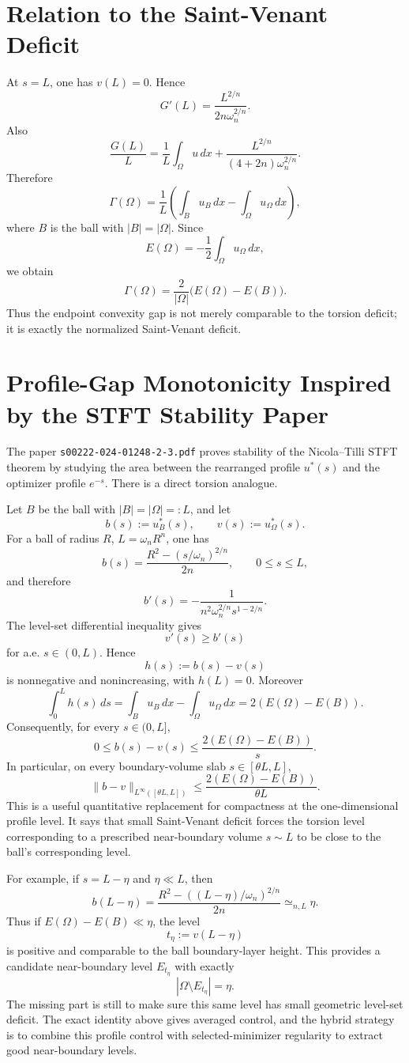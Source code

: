 \documentclass[11pt]{article}
\begin{document}
\section{Relation to the Saint-Venant Deficit}

At \(s=L\), one has \(v(L)=0\). Hence
\[
G'(L)=\frac{L^{2/n}}{2n\omega_n^{2/n}}.
\]
Also
\[
\frac{G(L)}{L}
=
\frac1L\int_\Omega u\,dx
+
\frac{L^{2/n}}{(4+2n)\omega_n^{2/n}}.
\]
Therefore
\[
\Gamma(\Omega)
=
\frac1L\left(\int_B u_B\,dx-\int_\Omega u_\Omega\,dx\right),
\]
where \(B\) is the ball with \(|B|=|\Omega|\). Since
\[
E(\Omega)=-\frac12\int_\Omega u_\Omega\,dx,
\]
we obtain
\[
\boxed{
\Gamma(\Omega)
=
\frac{2}{|\Omega|}
\big(E(\Omega)-E(B)\big).
}
\]
Thus the endpoint convexity gap is not merely comparable to the torsion
deficit; it is exactly the normalized Saint-Venant deficit.

\section{Profile-Gap Monotonicity Inspired by the STFT Stability Paper}

The paper \texttt{s00222-024-01248-2-3.pdf} proves stability of the
Nicola--Tilli STFT theorem by studying the area between the rearranged profile
\(u^*(s)\) and the optimizer profile \(e^{-s}\). There is a direct torsion
analogue.

Let \(B\) be the ball with \(|B|=|\Omega|=:L\), and let
\[
b(s):=u_B^*(s),\qquad v(s):=u_\Omega^*(s).
\]
For a ball of radius \(R\), \(L=\omega_n R^n\), one has
\[
b(s)=\frac{R^2-(s/\omega_n)^{2/n}}{2n},
\qquad 0\le s\le L,
\]
and therefore
\[
b'(s)=-\frac{1}{n^2\omega_n^{2/n}s^{1-2/n}}.
\]
The level-set differential inequality gives
\[
v'(s)\ge b'(s)
\]
for a.e. \(s\in(0,L)\). Hence
\[
h(s):=b(s)-v(s)
\]
is nonnegative and nonincreasing, with \(h(L)=0\). Moreover
\[
\int_0^L h(s)\,ds
=
\int_B u_B\,dx-\int_\Omega u_\Omega\,dx
=
2(E(\Omega)-E(B)).
\]
Consequently, for every \(s\in(0,L]\),
\[
0\le b(s)-v(s)
\le
\frac{2(E(\Omega)-E(B))}{s}.
\]
In particular, on every boundary-volume slab \(s\in[\theta L,L]\),
\[
\|b-v\|_{L^\infty([\theta L,L])}
\le
\frac{2(E(\Omega)-E(B))}{\theta L}.
\]
This is a useful quantitative replacement for compactness at the one-dimensional
profile level. It says that small Saint-Venant deficit forces the torsion level
corresponding to a prescribed near-boundary volume \(s\sim L\) to be close to the
ball's corresponding level.

For example, if \(s=L-\eta\) and \(\eta\ll L\), then
\[
b(L-\eta)
=
\frac{R^2-((L-\eta)/\omega_n)^{2/n}}{2n}
\simeq_{n,L}\eta.
\]
Thus if \(E(\Omega)-E(B)\ll \eta\), the level
\[
t_\eta:=v(L-\eta)
\]
is positive and comparable to the ball boundary-layer height. This provides a
candidate near-boundary level \(E_{t_\eta}\) with exactly
\[
|\Omega\setminus E_{t_\eta}|=\eta.
\]
The missing part is still to make sure this same level has small geometric
level-set deficit. The exact identity above gives averaged control, and the
hybrid strategy is to combine this profile control with selected-minimizer
regularity to extract good near-boundary levels.
\end{document}
